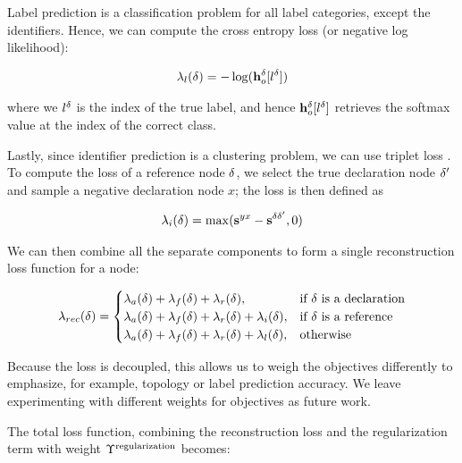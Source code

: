 Label prediction is a classification problem for all label categories, except the identifiers.
Hence, we can compute the cross entropy loss (or negative log likelihood):

\begin{align}
    \lambda_{l}(\delta) = - \log(\mathbf{h}_o^\delta[l^\delta])
\end{align}

\noindent where we $l^\delta$ is the index of the true label, and hence $\mathbf{h}_o^\delta[l^\delta]$ retrieves the softmax value at the index of the correct class. 

Lastly, since identifier prediction is a clustering problem, we can use triplet loss \cite{chechik2010large}. 
To compute the loss of a reference node $\delta$, we select the true declaration node $\delta'$ and sample a negative declaration node $x$; the loss is then defined as

\begin{align}
    \lambda_i(\delta)=\max(\mathbf{s}^{yx} - \mathbf{s}^{\delta \delta'},0)
\end{align}

\noindent We can then combine all the separate components to form a single reconstruction loss function for a node:

\begin{small}
\begin{align}
   \lambda_{rec}(\delta) = 
\begin{cases}
    \lambda_{a}(\delta) + \lambda_{f}(\delta) + \lambda_{r}(\delta),& \text{if } \delta \text{ is a declaration} \\
    \lambda_{a}(\delta) + \lambda_{f}(\delta) + \lambda_{r}(\delta) + \lambda_{i}(\delta),& \text{if } \delta \text{ is a reference} \\
    \lambda_{a}(\delta) + \lambda_{f}(\delta) + \lambda_{r}(\delta) + \lambda_{l}(\delta),& \text{otherwise}
\end{cases}
\end{align}
\end{small}

Because the loss is decoupled, this allows us to weigh the objectives differently to emphasize, for example, topology or label prediction accuracy. We leave experimenting with different weights for objectives as future work. 

The total loss function, combining the reconstruction loss and the regularization term with weight $\Upsilon^\text{regularization}$ becomes:

